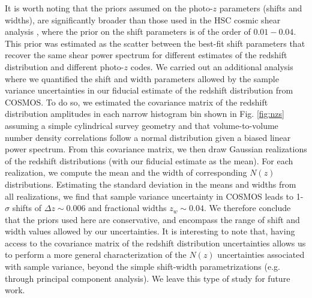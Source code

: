 \documentclass[a4paper,11pt]{article}
\begin{document}
    It is worth noting that the priors assumed on the photo-$z$ parameters (shifts and widths), are significantly broader than those used in the HSC cosmic shear analysis \cite{2019PASJ...71...43H}, where the prior on the shift parameters is of the order of $0.01-0.04$. This prior was estimated as the scatter between the best-fit shift parameters that recover the same shear power spectrum for different estimates of the redshift distribution and different photo-$z$ codes. We carried out an additional analysis where we quantified the shift and width parameters allowed by the sample variance uncertainties in our fiducial estimate of the redshift distribution from COSMOS. To do so, we estimated the covariance matrix of the redshift distribution amplitudes in each narrow histogram bin shown in Fig. \ref{fig:nzs} assuming a simple cylindrical survey geometry and that volume-to-volume number density correlations follow a normal distribution given a biased linear power spectrum. From this covariance matrix, we then draw Gaussian realizations of the redshift distributions (with our fiducial estimate as the mean). For each realization, we compute the mean and the width of corresponding $N(z)$ distributions. Estimating the standard deviation in the means and widths from all realizations, we find that sample variance uncertainty in COSMOS leads to 1-$\sigma$ shifts of $\Delta z\sim0.006$ and fractional widths $z_w\sim 0.04$.  We therefore conclude that the priors used here are conservative, and encompass the range of shift and width values allowed by our uncertainties. It is interesting to note that, having access to the covariance matrix of the redshift distribution uncertainties  allows us to perform a more general characterization of the $N(z)$ uncertainties associated with sample variance, beyond the simple shift-width parametrizations (e.g. through principal component analysis). We leave this type of study for future work.
\end{document}
